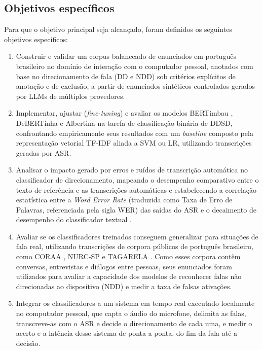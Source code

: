 \documentclass[
    12pt,                %
    openright,           %
    oneside,             %
    a4paper,             %
    english,             %
    brazil               %
]{abntex2}
\begin{document}
\subsection{Objetivos específicos}

Para que o objetivo principal seja alcançado, foram definidos os seguintes objetivos específicos:

\begin{enumerate}
    \item Construir e validar um corpus balanceado de enunciados em português brasileiro no domínio de interação com o computador pessoal, anotados com base no direcionamento de fala (DD e NDD) sob critérios explícitos de anotação e de exclusão, a partir de enunciados sintéticos controlados gerados por LLMs de múltiplos provedores.

    \item Implementar, ajustar (\textit{fine-tuning}) e avaliar os modelos BERTimbau \cite{Souza2020}, DeBERTinha \cite{Campiotti2023} e Albertina \cite{Santos2024} na tarefa de classificação binária de DDSD, confrontando empiricamente seus resultados com um \textit{baseline} composto pela representação vetorial TF-IDF aliada a SVM ou LR, utilizando transcrições geradas por ASR.

    \item Analisar o impacto gerado por erros e ruídos de transcrição automática no classificador de direcionamento, mapeando o desempenho comparativo entre o texto de referência e as transcrições automáticas e estabelecendo a correlação estatística entre a \textit{Word Error Rate} (traduzida como Taxa de Erro de Palavras, referenciada pela sigla WER) das saídas do ASR e o decaimento de desempenho do classificador textual \cite{Dighe2024}.

    \item Avaliar se os classificadores treinados conseguem generalizar para situações de fala real, utilizando transcrições de corpora públicos de português brasileiro, como CORAA \cite{CORAA2023}, NURC-SP \cite{NURCSP2025} e TAGARELA \cite{Tagarela2026}. Como esses corpora contêm conversas, entrevistas e diálogos entre pessoas, seus enunciados foram utilizados para avaliar a capacidade dos modelos de reconhecer falas não direcionadas ao dispositivo (NDD) e medir a taxa de falsas ativações.

    \item Integrar os classificadores a um sistema em tempo real executado localmente no computador pessoal, que capta o áudio do microfone, delimita as falas, transcreve-as com o ASR e decide o direcionamento de cada uma, e medir o acerto e a latência desse sistema de ponta a ponta, do fim da fala até a decisão.
\end{enumerate}
\end{document}
